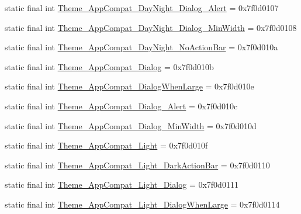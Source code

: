 \begin{DoxyCompactItemize}
\item 
static final int \mbox{\hyperlink{classandroid_1_1support_1_1design_1_1_r_1_1style_a817ac42257661b14c85637671bbfb502}{Theme\+\_\+\+App\+Compat\+\_\+\+Day\+Night\+\_\+\+Dialog\+\_\+\+Alert}} = 0x7f0d0107
\item 
static final int \mbox{\hyperlink{classandroid_1_1support_1_1design_1_1_r_1_1style_a0ff3354e007d5bf0f33b51169db2d927}{Theme\+\_\+\+App\+Compat\+\_\+\+Day\+Night\+\_\+\+Dialog\+\_\+\+Min\+Width}} = 0x7f0d0108
\item 
static final int \mbox{\hyperlink{classandroid_1_1support_1_1design_1_1_r_1_1style_abd2683624e794ff36ad8f50ee4721add}{Theme\+\_\+\+App\+Compat\+\_\+\+Day\+Night\+\_\+\+No\+Action\+Bar}} = 0x7f0d010a
\item 
static final int \mbox{\hyperlink{classandroid_1_1support_1_1design_1_1_r_1_1style_a68e5f0f49f3cbc58cb530e3977ba8d85}{Theme\+\_\+\+App\+Compat\+\_\+\+Dialog}} = 0x7f0d010b
\item 
static final int \mbox{\hyperlink{classandroid_1_1support_1_1design_1_1_r_1_1style_a53b0b06f59f50b329442743a580079d5}{Theme\+\_\+\+App\+Compat\+\_\+\+Dialog\+When\+Large}} = 0x7f0d010e
\item 
static final int \mbox{\hyperlink{classandroid_1_1support_1_1design_1_1_r_1_1style_ad919dfbf7c746414e586fcc4092892ec}{Theme\+\_\+\+App\+Compat\+\_\+\+Dialog\+\_\+\+Alert}} = 0x7f0d010c
\item 
static final int \mbox{\hyperlink{classandroid_1_1support_1_1design_1_1_r_1_1style_a8340a15f587d3800614ee46322218e0d}{Theme\+\_\+\+App\+Compat\+\_\+\+Dialog\+\_\+\+Min\+Width}} = 0x7f0d010d
\item 
static final int \mbox{\hyperlink{classandroid_1_1support_1_1design_1_1_r_1_1style_a919e23b493f57ba6c89a203538a1f629}{Theme\+\_\+\+App\+Compat\+\_\+\+Light}} = 0x7f0d010f
\item 
static final int \mbox{\hyperlink{classandroid_1_1support_1_1design_1_1_r_1_1style_a49d9a5053b6943cad2ad50d5d9d27e6c}{Theme\+\_\+\+App\+Compat\+\_\+\+Light\+\_\+\+Dark\+Action\+Bar}} = 0x7f0d0110
\item 
static final int \mbox{\hyperlink{classandroid_1_1support_1_1design_1_1_r_1_1style_a9c51a1db3bd57fcb2ed882ed1dd85829}{Theme\+\_\+\+App\+Compat\+\_\+\+Light\+\_\+\+Dialog}} = 0x7f0d0111
\item 
static final int \mbox{\hyperlink{classandroid_1_1support_1_1design_1_1_r_1_1style_ad18470224513598002203a19f9e9afb2}{Theme\+\_\+\+App\+Compat\+\_\+\+Light\+\_\+\+Dialog\+When\+Large}} = 0x7f0d0114

\end{DoxyCompactItemize}
